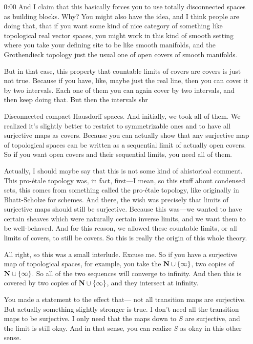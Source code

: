 \begin{unfinished}{0:00}
And I claim that this basically forces you to use totally disconnected spaces as building blocks. Why? You might also have the idea, and I think people are doing that, that if you want some kind of nice category of something like topological real vector spaces, you might work in this kind of smooth setting where you take your defining site to be like smooth manifolds, and the Grothendieck topology just the usual one of open covers of smooth manifolds.

But in that case, this property that countable limits of covers are covers is just not true. Because if you have, like, maybe just the real line, then you can cover it by two intervals. Each one of them you can again cover by two intervals, and then keep doing that. But then the intervals shr

Disconnected compact Hausdorff spaces. And initially, we took all of them. We realized it's slightly better to restrict to symmetrizable ones and to have all surjective maps as covers. Because you can actually show that any surjective map of topological spaces can be written as a sequential limit of actually open covers. So if you want open covers and their sequential limits, you need all of them.

Actually, I should maybe say that this is not some kind of ahistorical comment. This pro-étale topology was, in fact, first---I mean, so this stuff about condensed sets, this comes from something called the pro-étale topology, like originally in Bhatt-Scholze for schemes. And there, the wish was precisely that limits of surjective maps should still be surjective. Because this was---we wanted to have certain sheaves which were naturally certain inverse limits, and we want them to be well-behaved. And for this reason, we allowed these countable limits, or all limits of covers, to still be covers. So this is really the origin of this whole theory.

All right, so this was a small interlude. Excuse me. So if you have a surjective map of topological spaces, for example, you take the $\mathbf N \cup \{\infty\}$, two copies of $\mathbf N \cup \{\infty\}$. So all of the two sequences will converge to infinity. And then this is covered by two copies of $\mathbf N \cup \{\infty\}$, and they intersect at infinity.

You made a statement to the effect that--- not all transition maps are surjective. But actually something slightly stronger is true. I don't need all the transition maps to be surjective. I only need that the maps down to $S$ are surjective, and the limit is still okay. And in that sense, you can realize $S$ as okay in this other sense.


\end{unfinished}

